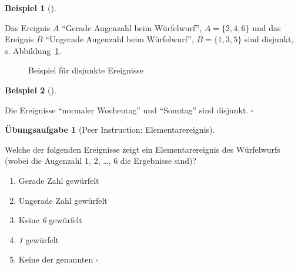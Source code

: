 \documentclass[
  ngerman,
  letterpaper,
  twoside,
  open=any]{scrbook}
\providecommand{\tightlist}{%
  \setlength{\itemsep}{0pt}\setlength{\parskip}{0pt}}\usepackage{longtable,booktabs,array}
\theoremstyle{definition}
\newtheorem{example}{Beispiel}[chapter]
\theoremstyle{plain}
\theoremstyle{definition}
\newtheorem{exercise}{Übungsaufgabe}[chapter]
\theoremstyle{definition}
\theoremstyle{remark}
\begin{document}
\begin{example}[]\protect\hypertarget{exm-disjunkt1}{}\label{exm-disjunkt1}

Das Ereignis \(A\) \enquote{Gerade Augenzahl beim Würfelwurf},
\(A=\{2,4,6\}\) und das Ereignis \(B\) \enquote{Ungerade Augenzahl beim
Würfelwurf}, \(B=\{1,3,5\}\) sind disjunkt, s.
Abbildung~\ref{fig-disjunkt1}.

\begin{figure}[H]


\caption{\label{fig-disjunkt1}Beispiel für disjunkte Ereignisse}

\end{figure}%

\end{example}

\begin{example}[]\protect\hypertarget{exm-disjunkt2}{}\label{exm-disjunkt2}

Die Ereignisse \enquote{normaler Wochentag} und \enquote{Sonntag} sind
disjunkt. \(\square\)

\end{example}

\begin{exercise}[Peer Instruction:
Elementarereignis]\protect\hypertarget{exr-elementarereignis}{}\label{exr-elementarereignis}

Welche der folgenden Ereignisse zeigt ein Elementarereignis des
Würfelwurfs (wobei die Augenzahl 1, 2, \ldots, 6 die Ergebnisse sind)?

\begin{enumerate}
\def\labelenumi{\Alph{enumi})}
\tightlist
\item
  Gerade Zahl gewürfelt
\item
  Ungerade Zahl gewürfelt
\item
  Keine \emph{6} gewürfelt
\item
  \emph{1} gewürfelt
\item
  Keine der genannten \(\square\)
\end{enumerate}

\end{exercise}
\end{document}
